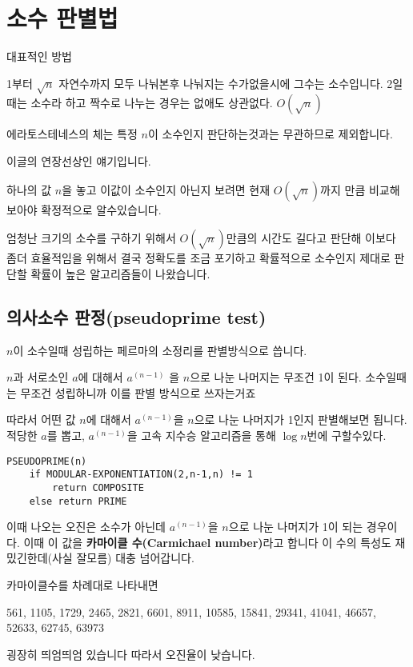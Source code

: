 \section{소수 판별법}

대표적인 방법

 1부터 $\sqrt{n}$ 자연수까지 모두 나눠본후 나눠지는 수가없을시에 그수는 소수입니다. 2일때는 소수라 하고 짝수로 나누는 경우는 없애도 상관없다.
$O(\sqrt{n})$

에라토스테네스의 체는 특정 $n$이 소수인지 판단하는것과는 무관하므로 제외합니다.


이글의 연장선상인 얘기입니다.

하나의 값 $n$을 놓고 이값이 소수인지 아닌지 보려면 현재 $O(\sqrt{n})$까지 만큼 비교해 보아야 확정적으로 알수있습니다.

엄청난 크기의 소수를 구하기 위해서 $O(\sqrt{n})$만큼의 시간도 길다고 판단해
이보다 좀더 효율적임을 위해서 결국 정확도를 조금 포기하고 확률적으로 소수인지 제대로 판단할 확률이 높은 알고리즘들이 나왔습니다.

\subsection{의사소수 판정(pseudoprime test)}

$n$이 소수일때 성립하는 페르마의 소정리를 판별방식으로 씁니다.

$n$과 서로소인 $a$에 대해서 $a^(n-1)$ 을 $n$으로 나눈 나머지는 무조건 1이 된다. 소수일때는 무조건 성립하니까 이를 판별 방식으로 쓰자는거죠

따라서 어떤 값 $n$에 대해서 $a^(n-1)$을 $n$으로 나눈 나머지가 1인지 판별해보면 됩니다.
적당한 $a$를 뽑고, $a^(n-1)$을
고속 지수승 알고리즘을 통해 $\log{n}$번에 구할수있다.

\begin{lstlisting}[style = CStyle]
PSEUDOPRIME(n)
    if MODULAR-EXPONENTIATION(2,n-1,n) != 1
        return COMPOSITE
    else return PRIME
\end{lstlisting}



이때 나오는 오진은 소수가 아닌데 $a^(n-1)$을 $n$으로 나눈 나머지가 1이 되는 경우이다.
이때 이 값을 \textbf{카마이클 수(Carmichael number)}라고 합니다 이 수의 특성도 재밌긴한데(사실 잘모름) 대충 넘어갑니다.

카마이클수를 차례대로 나타내면

561, 1105, 1729, 2465, 2821, 6601, 8911, 10585, 15841, 29341, 41041, 46657, 52633, 62745, 63973

굉장히 띄엄띄엄 있습니다 따라서 오진율이 낮습니다.




